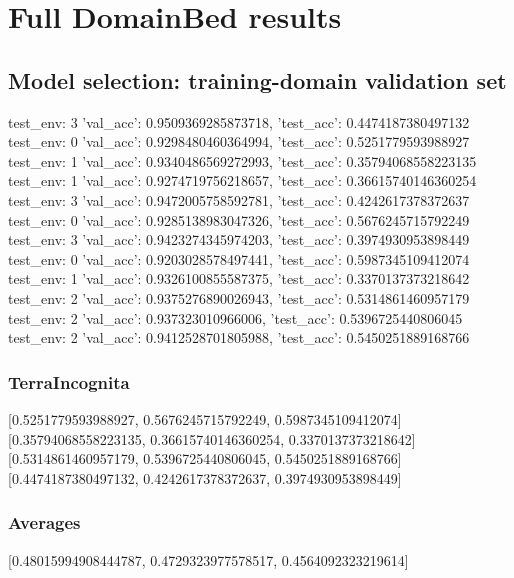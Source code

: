 \documentclass{article}
\begin{document}
\section{Full DomainBed results}

\subsection{Model selection: training-domain validation set}
test_env: 3
{'val_acc': 0.9509369285873718, 'test_acc': 0.4474187380497132}
test_env: 0
{'val_acc': 0.9298480460364994, 'test_acc': 0.5251779593988927}
test_env: 1
{'val_acc': 0.9340486569272993, 'test_acc': 0.35794068558223135}
test_env: 1
{'val_acc': 0.9274719756218657, 'test_acc': 0.36615740146360254}
test_env: 3
{'val_acc': 0.9472005758592781, 'test_acc': 0.4242617378372637}
test_env: 0
{'val_acc': 0.9285138983047326, 'test_acc': 0.5676245715792249}
test_env: 3
{'val_acc': 0.9423274345974203, 'test_acc': 0.3974930953898449}
test_env: 0
{'val_acc': 0.9203028578497441, 'test_acc': 0.5987345109412074}
test_env: 1
{'val_acc': 0.9326100855587375, 'test_acc': 0.3370137373218642}
test_env: 2
{'val_acc': 0.9375276890026943, 'test_acc': 0.5314861460957179}
test_env: 2
{'val_acc': 0.937323010966006, 'test_acc': 0.5396725440806045}
test_env: 2
{'val_acc': 0.9412528701805988, 'test_acc': 0.5450251889168766}

\subsubsection{TerraIncognita}
[0.5251779593988927, 0.5676245715792249, 0.5987345109412074]
[0.35794068558223135, 0.36615740146360254, 0.3370137373218642]
[0.5314861460957179, 0.5396725440806045, 0.5450251889168766]
[0.4474187380497132, 0.4242617378372637, 0.3974930953898449]

\begin{center}
\end{center}

\subsubsection{Averages}
[0.48015994908444787, 0.4729323977578517, 0.4564092323219614]

\begin{center}
\end{center}
\end{document}
